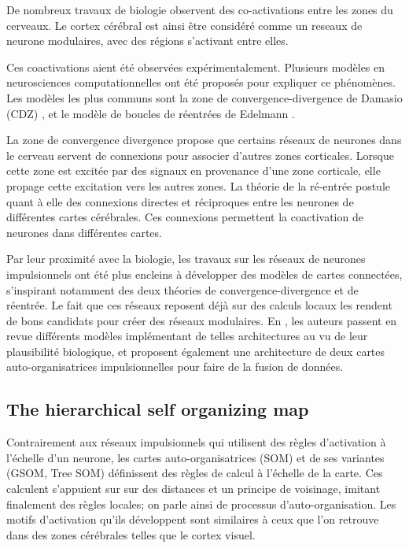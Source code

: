 De nombreux travaux de biologie observent des co-activations entre les zones du cerveaux. Le cortex cérébral est ainsi être considéré comme un reseaux de neurone modulaires, avec des régions s'activant entre elles. \cite{primate_cortex_91,mountcastle_columnar_1997,Harriger2012RichCO}

Ces coactivations aient été observées expérimentalement. Plusieurs modèles en neurosciences computationnelles ont été proposés pour expliquer ce phénomènes. Les modèles les plus communs sont la zone de convergence-divergence de Damasio (CDZ) \cite{damasio_time-locked_1989}, et le modèle de boucles de réentrées de Edelmann \cite{Edelman1982GroupSA}.

La zone de convergence divergence propose que certains réseaux de neurones dans le cerveau servent de connexions pour associer d'autres zones corticales. Lorsque cette zone est excitée par des signaux en provenance d'une zone corticale, elle propage cette excitation vers les autres zones.
La théorie de la ré-entrée postule quant à elle des connexions directes et réciproques entre  les neurones de différentes cartes cérébrales. Ces connexions permettent la coactivation de neurones dans différentes cartes. 

Par leur proximité avec la biologie, les travaux sur les réseaux de neurones impulsionnels ont été plus encleins à développer des modèles de cartes connectées, s'inspirant notamment des deux théories de convergence-divergence et de réentrée. Le fait que ces réseaux reposent déjà sur des calculs locaux les rendent de bons candidats pour créer des réseaux modulaires. En \cite{electronics9101605}, les auteurs passent en revue différents modèles implémentant de telles architectures au vu de leur plausibilité biologique, et proposent également une architecture de deux cartes auto-organisatrices impulsionnelles pour faire de la fusion de données.

\subsection{The hierarchical self organizing map}

Contrairement aux réseaux impulsionnels qui utilisent des règles d'activation à l'échelle d'un neurone, les cartes auto-organisatrices (SOM) et de ses variantes (GSOM, Tree SOM) définissent des règles de calcul à l'échelle de la carte.
 Ces calculent s'appuient sur sur des distances et un principe de voisinage, imitant finalement des règles locales; on parle ainsi de processus d'auto-organisation. Les motifs d'activation qu'ils développent sont similaires à ceux que l'on retrouve dans des zones cérébrales telles que le cortex visuel.

